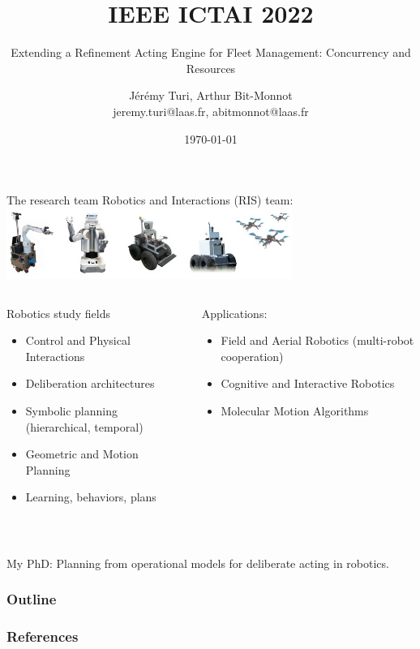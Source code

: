 \documentclass[handout, c,english]{beamer}
\title{IEEE ICTAI 2022}
\subtitle{Extending a Refinement Acting Engine for Fleet Management: Concurrency and Resources}
\author{Jérémy Turi, Arthur Bit-Monnot \\
jeremy.turi@laas.fr, abitmonnot@laas.fr}
\institute{\textit{LAAS-CNRS, Université de Toulouse, CNRS, INSA,} Toulouse, France}
\date{\today}
\begin{document}
\begin{frame}
\titlepage
\end{frame}



\begin{frame}[t]{The research team}
  \centering
      Robotics and Interactions (RIS) team:
      \includegraphics[width=0.7\textwidth]{images/RIS-robot-banner.jpg}
  
  \begin{columns}[t]
    \begin{column}{0.5\textwidth}
      Robotics study fields
      \footnotesize
      \begin{itemize}
          \item Control and Physical Interactions
          \item Deliberation architectures
          \item Symbolic planning (hierarchical, temporal)
          \item Geometric and Motion Planning
          \item Learning, behaviors, plans
      \end{itemize}
    \end{column}
    \begin{column}{0.5\textwidth}
      Applications:
      \footnotesize
      \begin{itemize}
        \item Field and Aerial Robotics (multi-robot cooperation)
        \item Cognitive and Interactive Robotics
        \item Molecular Motion Algorithms
      \end{itemize}
    \end{column}
  \end{columns}
  ~~
  
  My PhD: Planning from operational models for deliberate acting in robotics.
\end{frame}

\begin{frame}
\frametitle{Outline}
\tableofcontents
\end{frame}







%
%
%
\begin{frame}[allowframebreaks]
  \frametitle{References}
  
  
\end{frame}
\end{document}
